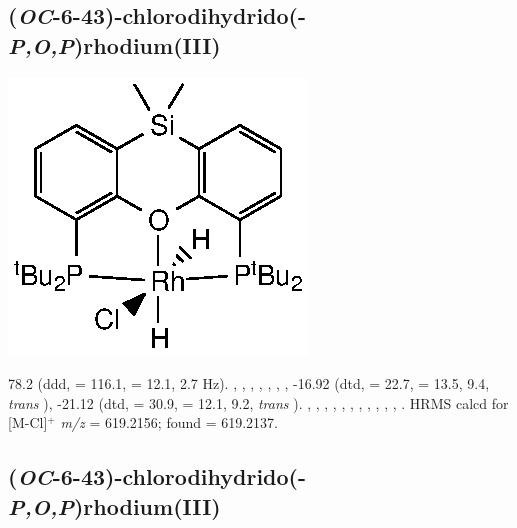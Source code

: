 
\subsection*{(\emph{OC}-6-43)-chlorodihydrido(\tBusixantphosk-\emph{P,O,P})rhodium(III)}

\begin{structure}[h]
\begin{center}
\includegraphics{../Structures/SitBuRhClH2.eps}
\end{center}
\end{structure}

78.2 (ddd, \JRhP{} = 116.1, \JPH{} = 12.1, 2.7 Hz).
,
,
,
,
,
,
,
-16.92 (dtd, \JRhH{} = 22.7, \JPH{} = 13.5, \JHH{} 9.4,  \emph{trans} ),
-21.12 (dtd, \JRhH{} = 30.9, \JPH{} = 12.1, \JHH{} 9.2,  \emph{trans} ).
,
,
,
,
,
,
,
,
,
,
,
.
HRMS calcd for  [M-Cl]$^+$ \emph{m/z} = 619.2156; found = 619.2137.



\subsection*{(\emph{OC}-6-43)-chlorodihydrido(\tButhixantphosk-\emph{P,O,P})rhodium(III)}

